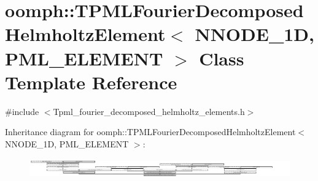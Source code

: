 \hypertarget{classoomph_1_1TPMLFourierDecomposedHelmholtzElement}{}\section{oomph\+:\+:T\+P\+M\+L\+Fourier\+Decomposed\+Helmholtz\+Element$<$ N\+N\+O\+D\+E\+\_\+1D, P\+M\+L\+\_\+\+E\+L\+E\+M\+E\+NT $>$ Class Template Reference}
\label{classoomph_1_1TPMLFourierDecomposedHelmholtzElement}


{\ttfamily \#include $<$Tpml\+\_\+fourier\+\_\+decomposed\+\_\+helmholtz\+\_\+elements.\+h$>$}

Inheritance diagram for oomph\+:\+:T\+P\+M\+L\+Fourier\+Decomposed\+Helmholtz\+Element$<$ N\+N\+O\+D\+E\+\_\+1D, P\+M\+L\+\_\+\+E\+L\+E\+M\+E\+NT $>$\+:\begin{figure}[H]
\begin{center}
\leavevmode
\includegraphics[height=0.838323cm]{classoomph_1_1TPMLFourierDecomposedHelmholtzElement}
\end{center}
\end{figure}

